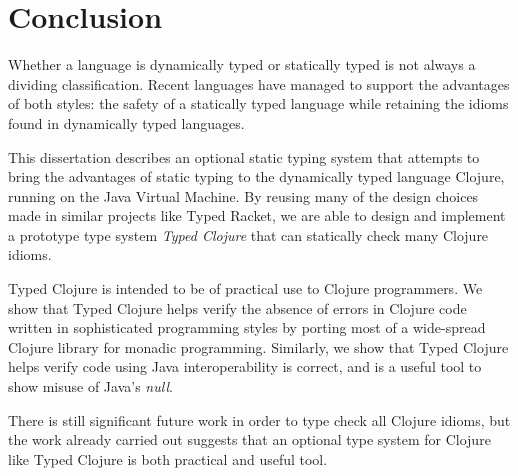 \documentclass{cshonours}
\begin{document}








\chapter{Conclusion}

Whether a language is dynamically typed or statically typed is not always a
dividing classification. Recent languages have managed to support the advantages of both styles:
the safety of a statically typed language while retaining the idioms found in
dynamically typed languages.

This dissertation describes an optional static typing system
that attempts to bring the advantages of static typing to the dynamically typed language
Clojure, running on the Java Virtual Machine. 
By reusing many of the design choices made in similar projects
like Typed Racket, we are able to design and implement a prototype type system
\emph{Typed Clojure} that can statically check many Clojure idioms.

Typed Clojure is intended to be of practical use to Clojure programmers.
We show that Typed Clojure helps verify the absence of errors in Clojure code written in sophisticated
programming styles by porting most of a wide-spread Clojure library for monadic programming.
Similarly, we show that Typed Clojure helps verify code using Java interoperability is correct, and is
a useful tool to show misuse of Java's \emph{null}.

There is still significant future work in order to type check all Clojure idioms,
but the work already carried out suggests that an optional type system for Clojure
like Typed Clojure is both practical and useful tool.

\printbibliography[title=References]


\end{document}
